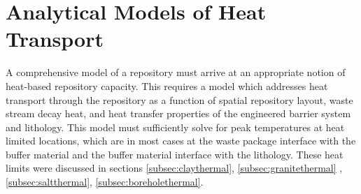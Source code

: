 










\section{Analytical Models of Heat Transport} \label{sec:analytical_heat}
 
A comprehensive model of a repository must arrive at an appropriate notion of 
heat-based repository capacity.  This requires a model which addresses heat 
transport through the repository as a function of spatial repository layout, 
waste stream decay heat, and heat transfer properties of the engineered barrier  
system and lithology. This model must sufficiently solve for peak temperatures 
at heat limited locations, which are in most cases at the waste package 
interface with the buffer material and the buffer material interface with the 
lithology. These heat limits were discussed in sections \ref{subsec:claythermal}, 
\ref{subsec:granitethermal} , \ref{subsec:saltthermal},   
\ref{subsec:boreholethermal}.

